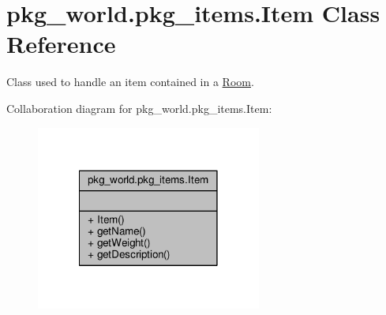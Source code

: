 \hypertarget{classpkg__world_1_1pkg__items_1_1Item}{\section{pkg\-\_\-world.\-pkg\-\_\-items.\-Item Class Reference}
\label{classpkg__world_1_1pkg__items_1_1Item}
}


Class used to handle an item contained in a \hyperlink{classpkg__world_1_1Room}{Room}.  




Collaboration diagram for pkg\-\_\-world.\-pkg\-\_\-items.\-Item\-:\nopagebreak
\begin{figure}[H]
\begin{center}
\leavevmode
\includegraphics[width=210pt]{classpkg__world_1_1pkg__items_1_1Item__coll__graph}
\end{center}
\end{figure}
